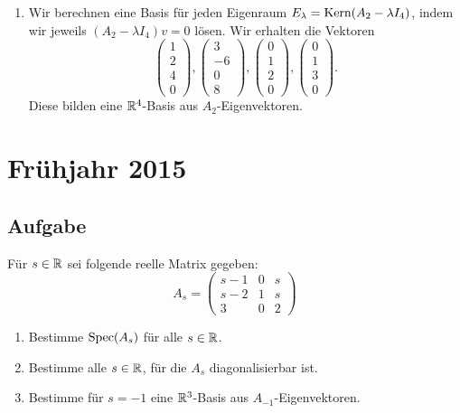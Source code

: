 \begin{enumerate}
	 \item Wir berechnen eine Basis für jeden Eigenraum \( E_\lambda = \text{Kern}(A_2 - \lambda I_4) \), indem wir jeweils \( (A_2 - \lambda I_4)v = 0 \) lösen. Wir erhalten die Vektoren
	 \begin{equation*}
	 	\begin{pmatrix}
	 		1 \\ 2 \\ 4 \\ 0
	 	\end{pmatrix}, \begin{pmatrix}
	 		3 \\ -6 \\ 0 \\ 8
	 	\end{pmatrix}, \begin{pmatrix}
	 		0 \\ 1 \\ 2 \\ 0
	 	\end{pmatrix}, \begin{pmatrix}
	 		0 \\ 1 \\ 3 \\ 0
	 	\end{pmatrix}\text{.}
	 \end{equation*}
	 Diese bilden eine \( \mathbb{R}^4 \)-Basis aus \( A_2 \)-Eigenvektoren.
\end{enumerate}

\newpage

\section{Frühjahr 2015}

\subsection{Aufgabe}
Für \( s \in \mathbb{R} \) sei folgende reelle Matrix gegeben:
\begin{equation*}
	A_s = \begin{pmatrix}
		s-1 & 0 & s \\
		s-2 & 1 & s \\
		3 & 0 & 2
	\end{pmatrix}
\end{equation*}
\begin{enumerate}
	\item Bestimme \( \text{Spec}(A_s) \) für alle \( s \in \mathbb{R} \).
	\item Bestimme alle \( s \in \mathbb{R} \), für die \( A_s \) diagonalisierbar ist.
	\item Bestimme für \( s = -1 \) eine \( \mathbb{R}^3 \)-Basis aus \( A_{-1} \)-Eigenvektoren. 
\end{enumerate}

